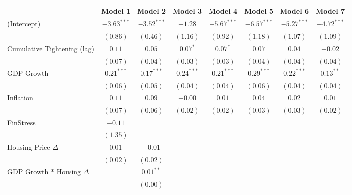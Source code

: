 
\begin{tabular}{l c c c c c c c }
\hline
 & Model 1 & Model 2 & Model 3 & Model 4 & Model 5 & Model 6 & Model 7 \\
\hline
(Intercept)                   & $-3.63^{***}$ & $-3.52^{***}$ & $-1.28$      & $-5.67^{***}$ & $-6.57^{***}$ & $-5.27^{***}$ & $-4.72^{***}$ \\
                              & $(0.86)$      & $(0.46)$      & $(1.16)$     & $(0.92)$      & $(1.18)$      & $(1.07)$      & $(1.09)$      \\
Cumulative Tightening (lag)   & $0.11$        & $0.05$        & $0.07^{*}$   & $0.07^{*}$    & $0.07$        & $0.04$        & $-0.02$       \\
                              & $(0.07)$      & $(0.04)$      & $(0.03)$     & $(0.03)$      & $(0.04)$      & $(0.04)$      & $(0.04)$      \\
GDP Growth                    & $0.21^{***}$  & $0.17^{***}$  & $0.24^{***}$ & $0.21^{***}$  & $0.29^{***}$  & $0.22^{***}$  & $0.13^{**}$   \\
                              & $(0.06)$      & $(0.05)$      & $(0.04)$     & $(0.04)$      & $(0.06)$      & $(0.04)$      & $(0.04)$      \\
Inflation                     & $0.11$        & $0.09$        & $-0.00$      & $0.01$        & $0.04$        & $0.02$        & $0.01$        \\
                              & $(0.07)$      & $(0.06)$      & $(0.02)$     & $(0.02)$      & $(0.03)$      & $(0.03)$      & $(0.02)$      \\
FinStress                     & $-0.11$       &               &              &               &               &               &               \\
                              & $(1.35)$      &               &              &               &               &               &               \\
Housing Price $\Delta$        & $0.01$        & $-0.01$       &              &               &               &               &               \\
                              & $(0.02)$      & $(0.02)$      &              &               &               &               &               \\
GDP Growth * Housing $\Delta$ &               & $0.01^{**}$   &              &               &               &               &               \\
                              &               & $(0.00)$      &              &               &               &               &               \\

\end{tabular}
